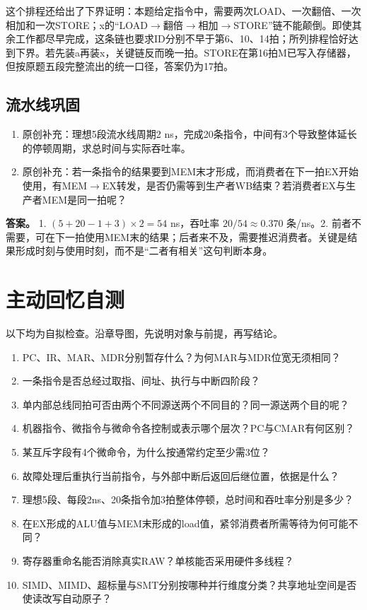 这个排程还给出了下界证明：本题给定指令中，需要两次LOAD、一次翻倍、一次相加和一次STORE；x的“LOAD\ensuremath{\to}翻倍\ensuremath{\to}相加\ensuremath{\to}STORE”链不能颠倒。即使其余工作都尽早完成，这条链也要求ID分别不早于第6、10、14拍；所列排程恰好达到下界。若先装a再装x，关键链反而晚一拍。STORE在第16拍M已写入存储器，但按原题五段完整流出的统一口径，答案仍为17拍。

\subsection{流水线巩固}\label{CO05-pipeline-check}

\begin{enumerate}
\def\labelenumi{\arabic{enumi}.}
\tightlist
\item
  原创补充：理想5段流水线周期2 ns，完成20条指令，中间有3个导致整体延长的停顿周期，求总时间与实际吞吐率。
\item
  原创补充：若一条指令的结果要到MEM末才形成，而消费者在下一拍EX开始使用，有MEM\ensuremath{\to}EX转发，是否仍需等到生产者WB结束？若消费者EX与生产者MEM是同一拍呢？
\end{enumerate}

\textbf{答案。} 1. \((5+20-1+3)\times2=54\) ns，吞吐率 \(20/54\approx0.370\) 条/ns。2. 前者不需要，可在下一拍使用MEM末的结果；后者来不及，需要推迟消费者。关键是结果形成时刻与使用时刻，而不是``二者有相关''这句判断本身。

\section{主动回忆自测}\label{CO05-recall}

以下均为自拟检查。沿章导图，先说明对象与前提，再写结论。

\begin{enumerate}
\def\labelenumi{\arabic{enumi}.}
\tightlist
\item
  PC、IR、MAR、MDR分别暂存什么？为何MAR与MDR位宽无须相同？
\item
  一条指令是否总经过取指、间址、执行与中断四阶段？
\item
  单内部总线同拍可否由两个不同源送两个不同目的？同一源送两个目的呢？
\item
  机器指令、微指令与微命令各控制或表示哪个层次？PC与CMAR有何区别？
\item
  某互斥字段有4个微命令，为什么按通常约定至少需3位？
\item
  故障处理后重执行当前指令，与外部中断后返回后继位置，依据是什么？
\item
  理想5段、每段2ns、20条指令加3拍整体停顿，总时间和吞吐率分别是多少？
\item
  在EX形成的ALU值与MEM末形成的load值，紧邻消费者所需等待为何可能不同？
\item
  寄存器重命名能否消除真实RAW？单核能否采用硬件多线程？
\item
  SIMD、MIMD、超标量与SMT分别按哪种并行维度分类？共享地址空间是否使读改写自动原子？
\end{enumerate}

